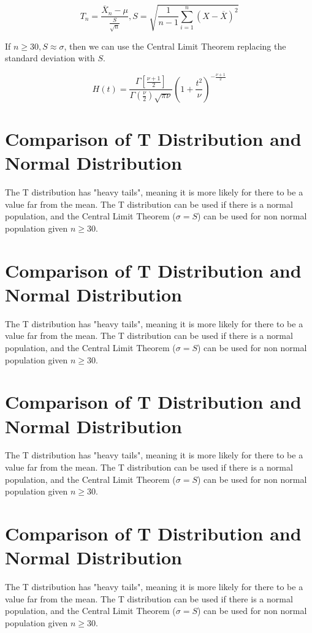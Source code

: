 \documentclass[12pt]{article}
\begin{document}
$$T_n = \frac{\overline{X}_n - \mu}{\frac{S}{\sqrt{n}}}, S = \sqrt{\frac{1}{n-1} \sum_{i=1}^n (X-\overline{X})^2}$$

If $n \geq 30, S \approx \sigma$, then we can use the Central Limit Theorem replacing the standard deviation with $S$.

\begin{defn}[T Distribution]
	$$H(t) = \frac{\Gamma\left[\frac{\nu+1}{2}\right]}{\Gamma\left(\frac{\nu}{2}\right)\sqrt{\pi\nu}} \left(1 + \frac{t^2}{\nu}\right)^{-\frac{\nu+1}{2}}$$
\end{defn}

\section{Comparison of T Distribution and Normal Distribution}

The T distribution has "heavy tails", meaning it is more likely for there to be a value far from the mean. The T distribution can be used if there is a normal population, and the Central Limit Theorem ($\sigma = S$) can be used for non normal population given $n \geq 30$. 

\section{Comparison of T Distribution and Normal Distribution}

The T distribution has "heavy tails", meaning it is more likely for there to be a value far from the mean. The T distribution can be used if there is a normal population, and the Central Limit Theorem ($\sigma = S$) can be used for non normal population given $n \geq 30$. 

\section{Comparison of T Distribution and Normal Distribution}

The T distribution has "heavy tails", meaning it is more likely for there to be a value far from the mean. The T distribution can be used if there is a normal population, and the Central Limit Theorem ($\sigma = S$) can be used for non normal population given $n \geq 30$. 

\section{Comparison of T Distribution and Normal Distribution}

The T distribution has "heavy tails", meaning it is more likely for there to be a value far from the mean. The T distribution can be used if there is a normal population, and the Central Limit Theorem ($\sigma = S$) can be used for non normal population given $n \geq 30$. 
\end{document}
